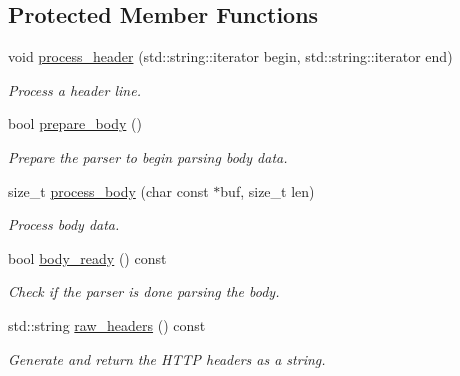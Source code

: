 \subsection*{Protected Member Functions}
\begin{DoxyCompactItemize}
\item 
void \hyperlink{classwebsocketpp_1_1http_1_1parser_1_1parser_a4dbb443fd916f8b4306e7afdb2e8ff45}{process\+\_\+header} (std\+::string\+::iterator begin, std\+::string\+::iterator end)
\begin{DoxyCompactList}\small\item\em Process a header line. \end{DoxyCompactList}\item 
bool \hyperlink{classwebsocketpp_1_1http_1_1parser_1_1parser_aabf5f8c33cad9202520337f8e2ed7aa5}{prepare\+\_\+body} ()
\begin{DoxyCompactList}\small\item\em Prepare the parser to begin parsing body data. \end{DoxyCompactList}\item 
size\+\_\+t \hyperlink{classwebsocketpp_1_1http_1_1parser_1_1parser_a3dc340d076f732092aed32c42d277503}{process\+\_\+body} (char const $\ast$buf, size\+\_\+t len)
\begin{DoxyCompactList}\small\item\em Process body data. \end{DoxyCompactList}\item 
bool \hyperlink{classwebsocketpp_1_1http_1_1parser_1_1parser_a0ef44170d582ad2b7a99472d5269b2f8}{body\+\_\+ready} () const 
\begin{DoxyCompactList}\small\item\em Check if the parser is done parsing the body. \end{DoxyCompactList}\item 
std\+::string \hyperlink{classwebsocketpp_1_1http_1_1parser_1_1parser_ac9a2caf768b90315ae256aa0a8505f94}{raw\+\_\+headers} () const 
\begin{DoxyCompactList}\small\item\em Generate and return the H\+T\+T\+P headers as a string. \end{DoxyCompactList}\end{DoxyCompactItemize}
